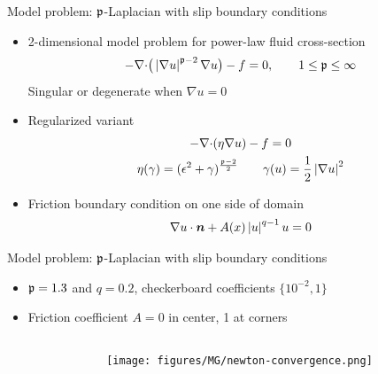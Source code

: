 \documentclass{beamer}
\begin{document}
\begin{frame}{Model problem: ${\mathfrak p}$-Laplacian with slip boundary conditions}
  \begin{itemize}
  \item 2-dimensional model problem for power-law fluid cross-section
    \begin{equation*}
      -{\nabla \cdot} \big(\left\lvert \nabla u \right\rvert^{{\mathfrak p}-2} \nabla u \big) - f = 0, \qquad 1 \le {\mathfrak p} \le \infty
    \end{equation*}
    Singular or degenerate when $\nabla u = 0$
  \item Regularized variant
    \begin{gather*}
      -{\nabla \cdot} (\eta \nabla u) - f = 0 \\
      \eta(\gamma) = (\epsilon^2 + \gamma)^{\frac{{\mathfrak p}-2}{2}} \qquad \gamma(u) = {\frac 1 2} \left\lvert \nabla u \right\rvert^2
    \end{gather*}
  \item Friction boundary condition on one side of domain
    \begin{gather*}
      \nabla u \cdot \bm n + A(x) \left\lvert u \right\rvert^{q-1} u = 0
    \end{gather*}
  \end{itemize}
\end{frame}

\begin{frame}{Model problem: ${\mathfrak p}$-Laplacian with slip boundary conditions}
  \begin{itemize}
  \item ${\mathfrak p} = 1.3$ and $q = 0.2$, checkerboard coefficients $\{10^{-2},1\}$
  \item Friction coefficient $A=0$ in center, 1 at corners
  \end{itemize}
  \begin{columns}
    \begin{column}{0.5\textwidth}
    \end{column}
    \begin{column}{0.5\textwidth}
      \texttt{[image: figures/MG/newton-convergence.png]}
    \end{column}
  \end{columns}
\end{frame}
\end{document}
